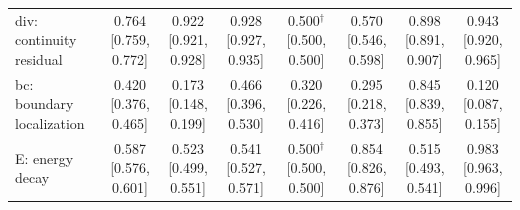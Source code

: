 \begin{table}[tb]
\begin{tabular}{lccccccc}
div: continuity residual & \shortstack{0.764\\{}[0.759, 0.772]} & \shortstack{0.922\\{}[0.921, 0.928]} & \shortstack{0.928\\{}[0.927, 0.935]} & \shortstack{0.500$^\dagger$\\{}[0.500, 0.500]} & \shortstack{0.570\\{}[0.546, 0.598]} & \shortstack{0.898\\{}[0.891, 0.907]} & \shortstack{0.943\\{}[0.920, 0.965]} \\[2pt]
bc: boundary localization & \shortstack{0.420\\{}[0.376, 0.465]} & \shortstack{0.173\\{}[0.148, 0.199]} & \shortstack{0.466\\{}[0.396, 0.530]} & \shortstack{0.320\\{}[0.226, 0.416]} & \shortstack{0.295\\{}[0.218, 0.373]} & \shortstack{0.845\\{}[0.839, 0.855]} & \shortstack{0.120\\{}[0.087, 0.155]} \\[2pt]
E: energy decay & \shortstack{0.587\\{}[0.576, 0.601]} & \shortstack{0.523\\{}[0.499, 0.551]} & \shortstack{0.541\\{}[0.527, 0.571]} & \shortstack{0.500$^\dagger$\\{}[0.500, 0.500]} & \shortstack{0.854\\{}[0.826, 0.876]} & \shortstack{0.515\\{}[0.493, 0.541]} & \shortstack{0.983\\{}[0.963, 0.996]} \\[2pt]
\bottomrule
\end{tabular}
\end{table}
